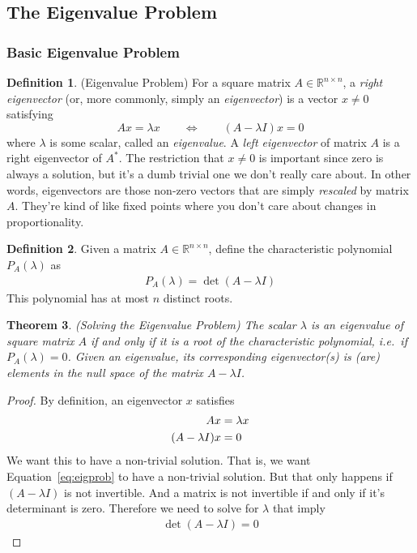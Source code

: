 \documentclass[12pt]{article}
\numberwithin{equation}{section} %
\theoremstyle{plain}
\newtheorem{thm}{Theorem}[section]
\theoremstyle{definition}
\newtheorem{defn}[thm]{Definition}
\theoremstyle{remark}
\newcommand{\R}{\mathbb{R}}
\begin{document}
\clearpage
\subsection{The Eigenvalue Problem}

\subsubsection{Basic Eigenvalue Problem}

\begin{defn}{(Eigenvalue Problem)}
For a square matrix $A \in \R^{n\times n}$, a \emph{right eigenvector}
(or, more commonly, simply an \emph{eigenvector}) is a vector $x\neq 0$
satisfying
\begin{equation}
  Ax = \lambda x
  \qquad \Leftrightarrow \qquad
  (A-\lambda I) x = 0
\end{equation}
where $\lambda$ is some scalar, called an \emph{eigenvalue}.  A
\emph{left eigenvector} of matrix $A$ is a right eigenvector of $A^*$.
The restriction that $x\neq 0$ is important since zero is always a
solution, but it's a dumb trivial one we don't really care about.  In
other words, eigenvectors are those non-zero vectors that are simply
\emph{rescaled} by matrix $A$. They're kind of like fixed points where
you don't care about changes in proportionality.
\end{defn}

\begin{defn}
Given a matrix $A\in \R^{n\times n}$, define the characteristic
polynomial $P_A(\lambda)$ as
\begin{align}
  \label{chareqn}
  P_A(\lambda) = \det(A-\lambda I)
\end{align}
This polynomial has at most $n$ distinct roots.
\end{defn}

\begin{thm}\emph{(Solving the Eigenvalue Problem)}
The scalar $\lambda$ is an eigenvalue of square matrix $A$ if and only
if it is a root of the characteristic polynomial, i.e.\ if
$P_A(\lambda)=0$.  Given an eigenvalue, its corresponding eigenvector(s)
is (are) elements in the null space of the matrix $A-\lambda I$.
\end{thm}
\begin{proof}
By definition, an eigenvector $x$ satisfies
\begin{align}
  A x &= \lambda x\notag\\
  (A- \lambda I)x &= 0
  \label{eq:eigprob}
\end{align}
We want this to have a non-trivial solution. That is, we want
Equation~\ref{eq:eigprob} to have a non-trivial solution. But that only
happens if $(A-\lambda I)$ is not invertible. And a matrix is not
invertible if and only if it's determinant is zero. Therefore we need to
solve for $\lambda$ that imply
\begin{align*}
  \det(A-\lambda I)=0
\end{align*}
\end{proof}
\end{document}
